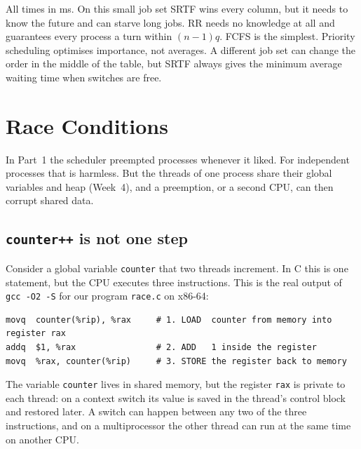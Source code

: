\documentclass[11pt,a4paper]{article}
\newcommand{\cmd}[1]{\texttt{#1}}
\begin{document}
All times in ms. On this small job set SRTF wins every column, but it needs to know the future and can starve long jobs. RR needs no knowledge at all and guarantees every process a turn within $(n-1)q$. FCFS is the simplest. Priority scheduling optimises importance, not averages. A different job set can change the order in the middle of the table, but SRTF always gives the minimum average waiting time when switches are free.

\section{Race Conditions}

In Part~1 the scheduler preempted processes whenever it liked. For independent processes that is harmless. But the threads of one process share their global variables and heap (Week~4), and a preemption, or a second CPU, can then corrupt shared data.

\subsection{\texttt{counter++} is not one step}

Consider a global variable \texttt{counter} that two threads increment. In C this is one statement, but the CPU executes three instructions. This is the real output of \cmd{gcc -O2 -S} for our program \texttt{race.c} on x86-64:

\begin{lstlisting}[style=term]
movq  counter(%rip), %rax     # 1. LOAD  counter from memory into register rax
addq  $1, %rax                # 2. ADD   1 inside the register
movq  %rax, counter(%rip)     # 3. STORE the register back to memory
\end{lstlisting}

The variable \texttt{counter} lives in shared memory, but the register \texttt{rax} is private to each thread: on a context switch its value is saved in the thread's control block and restored later. A switch can happen between any two of the three instructions, and on a multiprocessor the other thread can run at the same time on another CPU.
\end{document}
